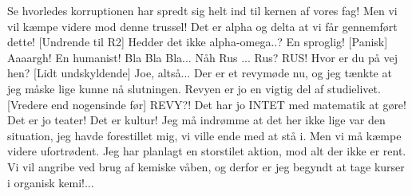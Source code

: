 \documentclass[a4paper,11pt]{article}
\begin{document}
\begin{sketch}
Se hvorledes korruptionen har spredt sig helt ind til kernen af vores fag! Men vi vil kæmpe videre mod denne trussel! Det er alpha og delta at vi får gennemført dette!
[Undrende til R2] Hedder det ikke alpha-omega..?
 En sproglig!
[Panisk] Aaaargh! En humanist! 
 Bla Bla Bla... 
 Nåh Rus ... Rus?  RUS! Hvor er du på vej hen?
[Lidt undskyldende] Joe, altså... Der er et revymøde nu, og jeg tænkte at jeg måske lige kunne nå slutningen. Revyen er jo en vigtig del af studielivet.
[Vredere end nogensinde før] REVY?! Det har jo INTET med matematik at gøre! Det er jo teater! Det er kultur!  Jeg må indrømme at det her ikke lige var den situation, jeg havde forestillet mig, vi ville ende med at stå i. Men vi må kæmpe videre ufortrødent. Jeg har planlagt en storstilet aktion, mod alt der ikke er rent. Vi vil angribe ved brug af kemiske våben, og derfor er jeg begyndt at tage kurser i organisk kemi!... 


\end{sketch}
\end{document}
